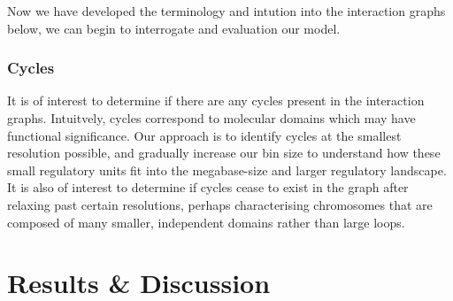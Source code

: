 \documentclass[phd,tocprelim]{cornell}
\begin{document}
Now we have developed the terminology and intution into the interaction
graphs below, we can begin to interrogate and evaluation our model.

\subsection{Cycles}

It is of interest to determine if there are any cycles present in the
interaction graphs.  Intuitvely, cycles correspond to molecular domains which
may have functional significance.  Our approach is to identify cycles at the
smallest resolution possible, and gradually increase our bin size to understand
how these small regulatory units fit into the megabase-size and larger regulatory
landscape.  It is also of interest to determine if cycles cease to exist in the
graph after relaxing past certain resolutions, perhaps characterising chromosomes
that are composed of many smaller, independent domains rather than large loops.



\chapter{Results & Discussion}




\end{document}
